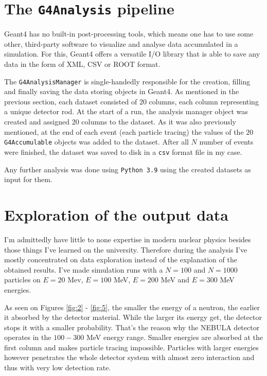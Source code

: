 \begin{multicols}{2}
\section{The \texttt{G4Analysis} pipeline}
Geant4 has no built-in post-processing tools, which means one has to use some other, third-party software to visualize and analyse data accumulated in a simulation. For this, Geant4 offers a versatile I/O library that is able to save any data in the form of XML, CSV or ROOT format.

The \texttt{G4AnalysisManager} is single-handedly responsible for the creation, filling and finally saving the data storing objects in Geant4. As mentioned in the previous section, each dataset consisted of $20$ columns, each column representing a unique detector rod. At the start of a run, the analysis manager object was created and assigned $20$ columns to the dataset. As it was also previously mentioned, at the end of each event (each particle tracing) the values of the $20$ \texttt{G4Accumulable} objects was added to the dataset. After all $N$ number of events were finished, the dataset was saved to disk in a \texttt{csv} format file in my case.

Any further analysis was done using \texttt{Python 3.9} using the created datasets as input for them.

\section{Exploration of the output data}
I'm admittedly have little to none expertise in modern nuclear physics besides those things I've learned on the university. Therefore during the analysis I've mostly concentrated on data exploration instead of the explanation of the obtained results. I've made simulation runs with a $N = 100$ and $N = 1000$ particles on $E = 20$ Mev, $E = 100$ MeV, $E = 200$ MeV and $E = 300$ MeV energies.
\begin{Figure}
	\centering
	\texttt{[image: \{images/nebula\_3d.png]}}
	\captionof{figure}{Particle traces penetrating the NEBULA detector after a neutron run of $100$ neutrons of $100$ MeV in the OpenGL+Qt visualization of the Geant4 simulation.} \label{fig:1}
\end{Figure}
As seen on Figures \ref{fig:2} - \ref{fig:5}, the smaller the energy of a neutron, the earlier it absorbed by the detector material. While the larger its energy get, the detector stops it with a smaller probability. That's the reason why the NEBULA detector operates in the $100-300$ MeV energy range. Smaller energies are absorbed at the first column and makes particle tracing impossible. Particles with larger energies however penetrates the whole detector system with almost zero interaction and thus with very low detection rate.


\end{multicols}
